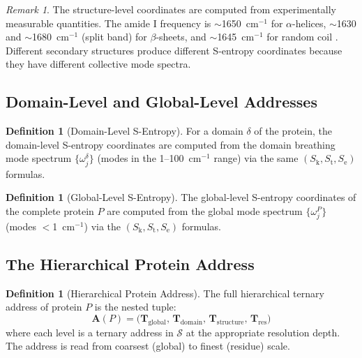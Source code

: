 \documentclass[11pt,twocolumn,a4paper]{article}
\theoremstyle{definition}
\newtheorem{definition}[theorem]{Definition}
\theoremstyle{remark}
\newtheorem{remark}[theorem]{Remark}
\newcommand{\Sk}{S_{\mathrm{k}}}
\newcommand{\St}{S_{\mathrm{t}}}
\newcommand{\Se}{S_{\mathrm{e}}}
\newcommand{\Sspace}{\mathcal{S}}
\begin{document}
\begin{remark}
The structure-level coordinates are computed from experimentally measurable quantities. The amide I frequency is $\sim$1650~cm$^{-1}$ for $\alpha$-helices, $\sim$1630 and $\sim$1680~cm$^{-1}$ (split band) for $\beta$-sheets, and $\sim$1645~cm$^{-1}$ for random coil \citep{barth2002, barth2007}. Different secondary structures produce different S-entropy coordinates because they have different collective mode spectra.
\end{remark}

\subsection{Domain-Level and Global-Level Addresses}

\begin{definition}[Domain-Level S-Entropy]
\label{def:domain_entropy}
For a domain $\delta$ of the protein, the domain-level S-entropy coordinates are computed from the domain breathing mode spectrum $\{\omega_j^\delta\}$ (modes in the 1--100~cm$^{-1}$ range) via the same $(\Sk, \St, \Se)$ formulas.
\end{definition}

\begin{definition}[Global-Level S-Entropy]
\label{def:global_entropy}
The global-level S-entropy coordinates of the complete protein $P$ are computed from the global mode spectrum $\{\omega_j^P\}$ (modes $<$1~cm$^{-1}$) via the $(\Sk, \St, \Se)$ formulas.
\end{definition}

\subsection{The Hierarchical Protein Address}

\begin{definition}[Hierarchical Protein Address]
\label{def:hierarchical_address}
The full hierarchical ternary address of protein $P$ is the nested tuple:
\begin{equation}
\mathbf{A}(P) = \bigl(\mathbf{T}_{\mathrm{global}}, \, \mathbf{T}_{\mathrm{domain}}, \, \mathbf{T}_{\mathrm{structure}}, \, \mathbf{T}_{\mathrm{res}}\bigr)
\label{eq:hierarchical}
\end{equation}
where each level is a ternary address in $\Sspace$ at the appropriate resolution depth. The address is read from coarsest (global) to finest (residue) scale.
\end{definition}
\end{document}
